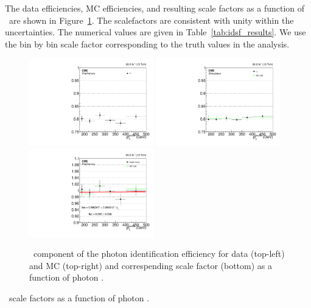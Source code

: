 The data efficiencies, MC efficiencies, and resulting scale factors as a function of \pt\ are shown in Figure~\ref{fig:idsf_results}. 
The scalefactors are consistent with unity within the uncertainties. 
The numerical values are given in Table~\ref{tab:idsf_results}. 
We use the bin by bin scale factor corresponding to the truth values in the analysis.

\begin{figure}[htbp]
  \begin{center}
    \includegraphics[width=0.48\textwidth]{Calibration/Figures/idsf/eff_data_ptalt.pdf}
    \includegraphics[width=0.48\textwidth]{Calibration/Figures/idsf/eff_mc_ptalt.pdf}
    \includegraphics[width=0.48\textwidth]{Calibration/Figures/idsf/scaleFactor_ptalt.pdf}
    \caption{
      \egamma\ component of the photon identification efficiency for data (top-left) and MC (top-right) and correspending scale factor (bottom) as a function of photon \pt.
    }
    \label{fig:idsf_results}
  \end{center}
\end{figure}
 
\begin{table}[htbp]
  \begin{center}
    \caption{\egamma\ scale factors as a function of photon \pt.}
    \label{tab:idsf_results}
    
  \end{center}
\end{table}


